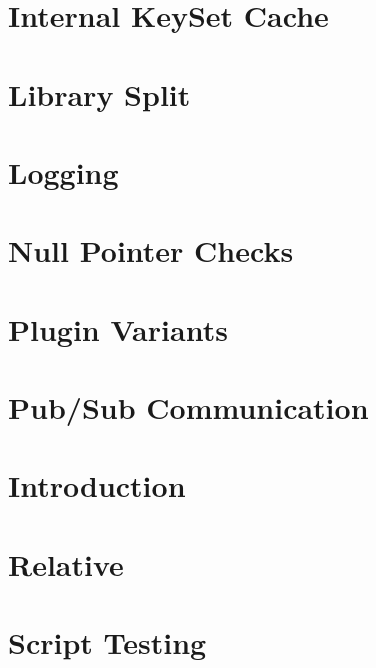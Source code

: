 \documentclass[twoside]{book}
\newcommand{\+}{\discretionary{\mbox{\scriptsize$\hookleftarrow$}}{}{}}
\begin{document}
\chapter{Internal Key\+Set Cache}
\label{doc_decisions_internal_cache_md}

\chapter{Library Split}
\label{doc_decisions_library_split_md}

\chapter{Logging}
\label{doc_decisions_logging_md}

\chapter{Null Pointer Checks}
\label{doc_decisions_null_pointer_checks_md}

\chapter{Plugin Variants}
\label{doc_decisions_plugin_variants_md}

\chapter{Pub/\+Sub Communication}
\label{doc_decisions_pubsub_md}

\chapter{Introduction}
\label{doc_decisions_README_md}

\chapter{Relative}
\label{doc_decisions_relative_md}

\chapter{Script Testing}
\label{doc_decisions_script_testing_md}

\end{document}
